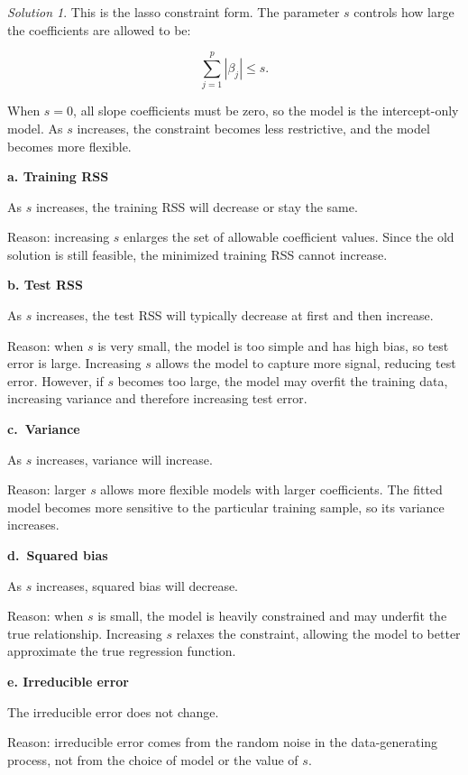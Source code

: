 \documentclass[
  english,
]{article}
\theoremstyle{definition}
\theoremstyle{definition}
\theoremstyle{remark}
\newtheorem*{solution}{Solution}
\begin{document}
\begin{solution}
This is the lasso constraint form. The parameter \(s\) controls how
large the coefficients are allowed to be:

\[
\sum_{j=1}^p |\beta_j| \le s.
\]

When \(s=0\), all slope coefficients must be zero, so the model is the
intercept-only model. As \(s\) increases, the constraint becomes less
restrictive, and the model becomes more flexible.

\textbf{a. Training RSS}

As \(s\) increases, the training RSS will decrease or stay the same.

Reason: increasing \(s\) enlarges the set of allowable coefficient
values. Since the old solution is still feasible, the minimized training
RSS cannot increase.

\textbf{b. Test RSS}

As \(s\) increases, the test RSS will typically decrease at first and
then increase.

Reason: when \(s\) is very small, the model is too simple and has high
bias, so test error is large. Increasing \(s\) allows the model to
capture more signal, reducing test error. However, if \(s\) becomes too
large, the model may overfit the training data, increasing variance and
therefore increasing test error.

\textbf{c.~Variance}

As \(s\) increases, variance will increase.

Reason: larger \(s\) allows more flexible models with larger
coefficients. The fitted model becomes more sensitive to the particular
training sample, so its variance increases.

\textbf{d.~Squared bias}

As \(s\) increases, squared bias will decrease.

Reason: when \(s\) is small, the model is heavily constrained and may
underfit the true relationship. Increasing \(s\) relaxes the constraint,
allowing the model to better approximate the true regression function.

\textbf{e. Irreducible error}

The irreducible error does not change.

Reason: irreducible error comes from the random noise in the
data-generating process, not from the choice of model or the value of
\(s\).
\end{solution}
\end{document}
